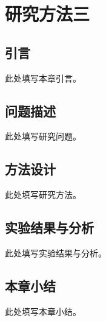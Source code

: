 \chapter{研究方法三}
\label{chap:method-three}
\section{引言}
此处填写本章引言。
\section{问题描述}
此处填写研究问题。
\section{方法设计}
此处填写研究方法。
\section{实验结果与分析}
此处填写实验结果与分析。
\section{本章小结}
此处填写本章小结。
